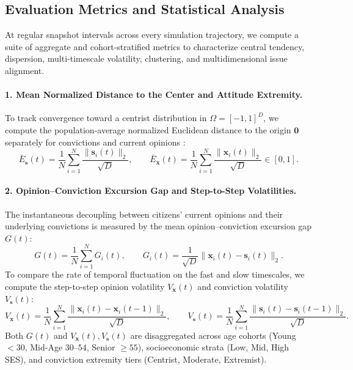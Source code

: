 \subsection{Evaluation Metrics and Statistical Analysis}
\label{subsec:metrics_analysis}

At regular snapshot intervals across every simulation trajectory, we compute a suite of aggregate and cohort-stratified metrics to characterize central tendency, dispersion, multi-timescale volatility, clustering, and multidimensional issue alignment.

\paragraph{1. Mean Normalized Distance to the Center and Attitude Extremity.}
To track convergence toward a centrist distribution in $\Omega = [-1, 1]^D$, we compute the population-average normalized Euclidean distance to the origin $\mathbf{0}$ separately for convictions and current opinions \citep{howe2017attitude}:
\begin{equation}
    \bar{E}_{\mathbf{s}}(t) = \frac{1}{N}\sum_{i=1}^N \frac{\|\mathbf{s}_i(t)\|_2}{\sqrt{D}}, \qquad
    \bar{E}_{\mathbf{x}}(t) = \frac{1}{N}\sum_{i=1}^N \frac{\|\mathbf{x}_i(t)\|_2}{\sqrt{D}} \in [0, 1].
    \label{eq:mean_distance_to_center}
\end{equation}

\paragraph{2. Opinion--Conviction Excursion Gap and Step-to-Step Volatilities.}
The instantaneous decoupling between citizens' current opinions and their underlying convictions is measured by the mean opinion--conviction excursion gap $G(t)$:
\begin{equation}
    G(t) = \frac{1}{N}\sum_{i=1}^N G_i(t), \qquad G_i(t) = \frac{1}{\sqrt{D}} \|\mathbf{x}_i(t) - \mathbf{s}_i(t)\|_2.
    \label{eq:op_conv_gap}
\end{equation}
To compare the rate of temporal fluctuation on the fast and slow timescales, we compute the step-to-step opinion volatility $V_{\mathbf{x}}(t)$ and conviction volatility $V_{\mathbf{s}}(t)$:
\begin{equation}
    V_{\mathbf{x}}(t) = \frac{1}{N}\sum_{i=1}^N \frac{\|\mathbf{x}_i(t) - \mathbf{x}_i(t-1)\|_2}{\sqrt{D}}, \qquad
    V_{\mathbf{s}}(t) = \frac{1}{N}\sum_{i=1}^N \frac{\|\mathbf{s}_i(t) - \mathbf{s}_i(t-1)\|_2}{\sqrt{D}}.
    \label{eq:step_volatilities}
\end{equation}
Both $G(t)$ and $V_{\mathbf{x}}(t), V_{\mathbf{s}}(t)$ are disaggregated across age cohorts (Young $<30$, Mid-Age $30\text{--}54$, Senior $\ge 55$), socioeconomic strata (Low, Mid, High SES), and conviction extremity tiers (Centrist, Moderate, Extremist).

